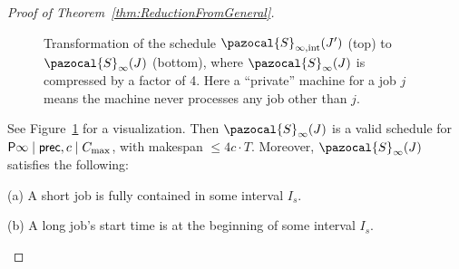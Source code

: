 \begin{proof}[Proof of Theorem~\ref{thm:ReductionFromGeneral}]
\begin{figure}
\begin{center}
  \caption{Transformation of the schedule $\pazocal{S}_{\infty,\text{int}}(J')$ (top) to $\pazocal{S}_{\infty}(J)$ (bottom), where  $\pazocal{S}_{\infty}(J)$ is compressed by a factor of 4. Here a ``private'' machine for a job $j$ means the machine never processes any job other than $j$.\label{fig:ScheduleTransformationStoSPrime}}
  \end{center}
\end{figure}

 See Figure~\ref{fig:ScheduleTransformationStoSPrime} for a visualization.
 Then  $\pazocal{S}_{\infty}(J)$ is a valid schedule for $\mathsf{P} \infty \mid \mathsf{prec},c \mid C_{\max}$, with makespan $\le 4c\cdot T$.
	Moreover, $\pazocal{S}_{\infty}(J)$ satisfies the following:
	\begin{enumerate*}
		\item[(a)]A short job is fully contained in some interval $I_s$.
		
		\item[(b)]A long job's start time is at the beginning of some interval $I_s$.
	\end{enumerate*}
	

\end{proof}
